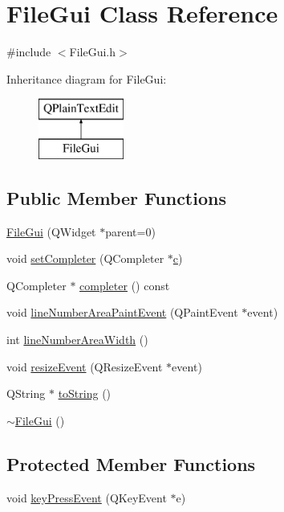 \hypertarget{class_file_gui}{\section{File\-Gui Class Reference}
\label{class_file_gui}
}


{\ttfamily \#include $<$File\-Gui.\-h$>$}

Inheritance diagram for File\-Gui\-:\begin{figure}[H]
\begin{center}
\leavevmode
\includegraphics[height=2.000000cm]{class_file_gui}
\end{center}
\end{figure}
\subsection*{Public Member Functions}
\begin{DoxyCompactItemize}
\item 
\hyperlink{class_file_gui_ac7c9b0cdbb2e89190a13318ec84c70a3}{File\-Gui} (Q\-Widget $\ast$parent=0)
\item 
void \hyperlink{class_file_gui_ab95b0b24bfee919e33bcf6c623c72842}{set\-Completer} (Q\-Completer $\ast$\hyperlink{class_file_gui_a71dfac2e67bf84af494667901b51ddc9}{c})
\item 
Q\-Completer $\ast$ \hyperlink{class_file_gui_a741c813e12ed8105bc9b30aa0a48c4d7}{completer} () const 
\item 
void \hyperlink{class_file_gui_a24940e7e57f49e81c451f137acfbe60a}{line\-Number\-Area\-Paint\-Event} (Q\-Paint\-Event $\ast$event)
\item 
int \hyperlink{class_file_gui_af5ea5edc018ed2ba6685ae6e5244483f}{line\-Number\-Area\-Width} ()
\item 
void \hyperlink{class_file_gui_a704d37c450e30eeb506a89f7e5b7a79e}{resize\-Event} (Q\-Resize\-Event $\ast$event)
\item 
Q\-String $\ast$ \hyperlink{class_file_gui_a0d31bd4f4169eff45e59fa79ba4e98f9}{to\-String} ()
\item 
\hyperlink{class_file_gui_a276b681a3fbd10e083463e32a361461c}{$\sim$\-File\-Gui} ()
\end{DoxyCompactItemize}
\subsection*{Protected Member Functions}
\begin{DoxyCompactItemize}
\item 
void \hyperlink{class_file_gui_aed2ed675e3d0eec814fda21479babb36}{key\-Press\-Event} (Q\-Key\-Event $\ast$e)
\end{DoxyCompactItemize}
